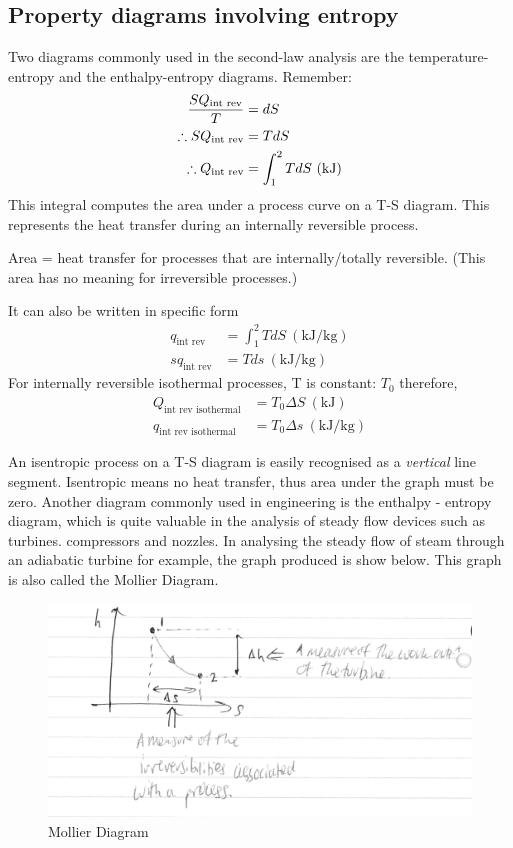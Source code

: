 \documentclass[class=report, crop=false, 12pt,a4paper]{standalone}
\begin{document}
\subsection{Property diagrams involving entropy}
Two diagrams commonly used in the second-law analysis are the temperature-entropy and the enthalpy-entropy diagrams. Remember:
\begin{align*}
  \frac{SQ_{\textrm{int rev}}}{T} &= dS\\
  \therefore SQ_{\textrm{\textrm{int rev}}} &= TdS\\
  \therefore Q_{\textrm{int rev}} &= \int_1^2 T dS \ (\si{\kilo\joule})
\end{align*}
This integral computes the area under a process curve on a T-S diagram. This represents the heat transfer during an internally reversible process.
\begin{center}
  Area = heat transfer for processes that are internally/totally reversible. (This area has no meaning for irreversible processes.)
\end{center}
It can also be written in specific form
\begin{align*}
  q_{\textrm{int rev}} &= \int_1^2 TdS \ (\si{\kilo\joule\per\kg})\\
  sq_{\textrm{int rev}} &= T ds \ (\si{\kilo\joule\per\kg})
\end{align*}
For internally reversible isothermal processes, T is constant: \(T_0\) therefore,
\begin{align*}
  Q_{\textrm{int rev isothermal}} &= T_0 \Delta S \ (\si{\kilo\joule})\\
  q_{\textrm{int rev isothermal}} &= T_0 \Delta s \ (\si{\kilo\joule\per\kg})
\end{align*}

An isentropic process on a T-S diagram is easily recognised as a \emph{vertical} line segment. Isentropic means no heat transfer, thus area under the graph must be zero. Another diagram commonly used in engineering is the enthalpy - entropy diagram, which is quite valuable in the analysis of steady flow devices such as turbines. compressors and nozzles. In analysing the steady flow of steam through an adiabatic turbine for example, the graph produced is show below. This graph is also called the Mollier Diagram.
\begin{figure}
  \includegraphics[width = \textwidth]{../img/MollierDiagram}
  \caption{Mollier Diagram}
\end{figure}
\end{document}

